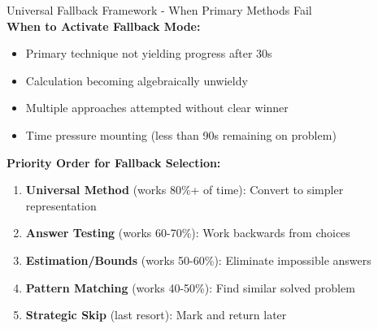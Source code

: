 \documentclass{article}
\begin{document}
\begin{classifybox}{Universal Fallback Framework - When Primary Methods Fail}
{\footnotesize\textcolor{timegreen}{}}\\
\textbf{When to Activate Fallback Mode:}
\begin{itemize}[nosep]
\item Primary technique not yielding progress after 30s
\item Calculation becoming algebraically unwieldy
\item Multiple approaches attempted without clear winner
\item Time pressure mounting (less than 90s remaining on problem)
\end{itemize}

\textbf{Priority Order for Fallback Selection:}
\begin{enumerate}[nosep]
\item \textbf{Universal Method} (works 80\%+ of time): Convert to simpler representation
\item \textbf{Answer Testing} (works 60-70\%): Work backwards from choices
\item \textbf{Estimation/Bounds} (works 50-60\%): Eliminate impossible answers
\item \textbf{Pattern Matching} (works 40-50\%): Find similar solved problem
\item \textbf{Strategic Skip} (last resort): Mark and return later
\end{enumerate}
\end{classifybox}
\end{document}

